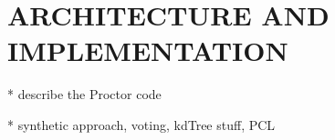 \section{ARCHITECTURE AND IMPLEMENTATION}
* describe the Proctor code

* synthetic approach, voting, kdTree stuff, PCL
